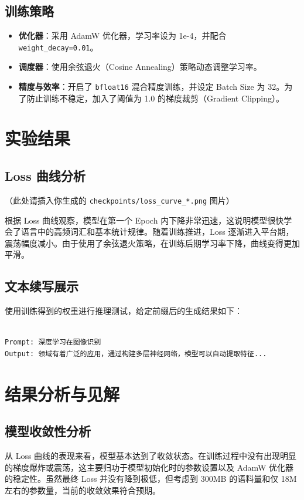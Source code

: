 \documentclass[a4paper,12pt]{ctexart} %
\begin{document}
\subsection{训练策略}
\begin{itemize}
    \item \textbf{优化器}：采用 AdamW 优化器，学习率设为 1e-4，并配合 \texttt{weight\_decay=0.01}。
    \item \textbf{调度器}：使用余弦退火（Cosine Annealing）策略动态调整学习率。
    \item \textbf{精度与效率}：开启了 \texttt{bfloat16} 混合精度训练，并设定 Batch Size 为 32。为了防止训练不稳定，加入了阈值为 1.0 的梯度裁剪（Gradient Clipping）。
\end{itemize}

\section{实验结果}

\subsection{Loss 曲线分析}
（此处请插入你生成的 \texttt{checkpoints/loss\_curve\_*.png} 图片）

根据 Loss 曲线观察，模型在第一个 Epoch 内下降非常迅速，这说明模型很快学会了语言中的高频词汇和基本统计规律。随着训练推进，Loss 逐渐进入平台期，震荡幅度减小。由于使用了余弦退火策略，在训练后期学习率下降，曲线变得更加平滑。

\subsection{文本续写展示}
使用训练得到的权重进行推理测试，给定前缀后的生成结果如下：

\begin{lstlisting}[caption={推理生成示例}]

Prompt: 深度学习在图像识别
Output: 领域有着广泛的应用，通过构建多层神经网络，模型可以自动提取特征...
\end{lstlisting}

\section{结果分析与见解}

\subsection{模型收敛性分析}
从 Loss 曲线的表现来看，模型基本达到了收敛状态。在训练过程中没有出现明显的梯度爆炸或震荡，这主要归功于模型初始化时的参数设置以及 AdamW 优化器的稳定性。虽然最终 Loss 并没有降到极低，但考虑到 300MB 的语料量和仅 18M 左右的参数量，当前的收敛效果符合预期。
\end{document}
